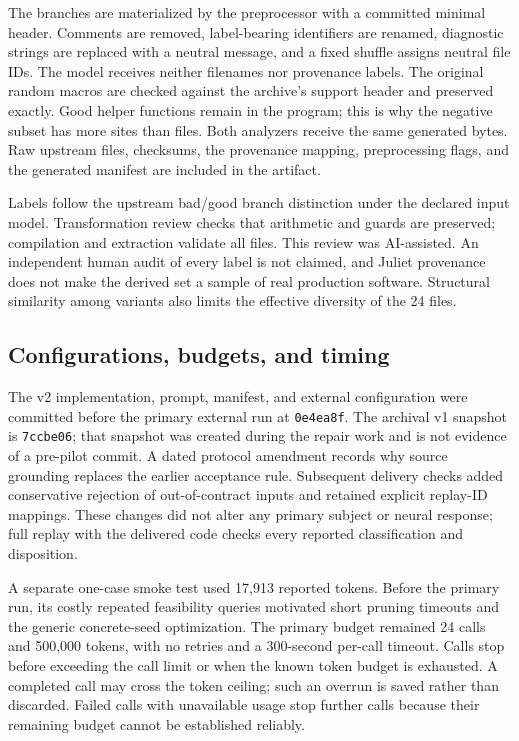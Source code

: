 \documentclass[sigconf]{acmart}
\begin{document}
The branches are materialized by the preprocessor with a committed minimal
header. Comments are removed, label-bearing identifiers are renamed, diagnostic
strings are replaced with a neutral message, and a fixed shuffle assigns
neutral file IDs. The model receives neither filenames nor provenance labels.
The original random macros are checked against the archive's support header
and preserved exactly. Good helper functions remain in the program; this is
why the negative subset has more sites than files. Both analyzers receive the
same generated bytes. Raw upstream files, checksums, the provenance mapping,
preprocessing flags, and the generated manifest are included in the artifact.

Labels follow the upstream bad/good branch distinction under the declared
input model. Transformation review checks that arithmetic and guards are
preserved; compilation and extraction validate all files. This review was
AI-assisted. An independent human audit of every label is not claimed, and
Juliet provenance does not make the derived set a sample of real production
software. Structural similarity among variants also limits the effective
diversity of the 24 files.

\subsection{Configurations, budgets, and timing}
The v2 implementation, prompt, manifest, and external configuration were
committed before the primary external run at \texttt{0e4ea8f}. The archival v1
snapshot is \texttt{7ccbe06}; that snapshot was created during the repair work
and is not evidence of a pre-pilot commit. A dated protocol amendment records
why source grounding replaces the earlier acceptance rule. Subsequent delivery
checks added conservative rejection of out-of-contract inputs and retained
explicit replay-ID mappings. These changes did not alter any primary subject
or neural response; full replay with the delivered code checks every reported
classification and disposition.

A separate one-case smoke test used 17,913 reported tokens. Before the primary
run, its costly repeated feasibility queries motivated short pruning timeouts
and the generic concrete-seed optimization. The primary budget remained 24
calls and 500,000 tokens, with no retries and a 300-second per-call timeout.
Calls stop before exceeding the call limit or when the known token budget is
exhausted. A completed call may cross the token ceiling; such an overrun is
saved rather than discarded. Failed calls with unavailable usage stop further
calls because their remaining budget cannot be established reliably.
\end{document}
